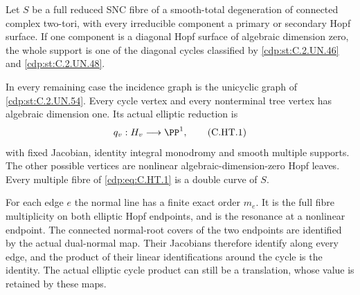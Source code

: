 \begin{proposition}\label{cdp:st:C.2.UN.58}

Let $S$ be a full reduced SNC fibre of a smooth-total degeneration
of connected complex two-tori, with every irreducible component a
primary or secondary Hopf surface. If one component is a diagonal
Hopf surface of algebraic dimension zero, the whole support is
one of the diagonal cycles classified by \ref{cdp:st:C.2.UN.46} and \ref{cdp:st:C.2.UN.48}.

In every remaining case the incidence graph is the unicyclic graph
of \ref{cdp:st:C.2.UN.54}. Every cycle vertex and every nonterminal tree vertex
has algebraic dimension one. Its actual elliptic reduction is
\[
                    q_v:H_v\longrightarrow\PP^1,        \tag{C.HT.1}\label{cdp:eq:C.HT.1}
\]
with fixed Jacobian, identity integral monodromy and smooth multiple
supports. The other possible vertices are nonlinear
algebraic-dimension-zero Hopf leaves. Every multiple fibre of
\eqref{cdp:eq:C.HT.1} is a double curve of $S$.

For each edge $e$ the normal line has a finite exact order $m_e$.
It is the full fibre multiplicity on both elliptic Hopf endpoints,
and is the resonance at a nonlinear endpoint. The connected
normal-root covers of the two endpoints are identified by the
actual dual-normal map. Their Jacobians therefore identify along
every edge, and the product of their linear identifications around
the cycle is the identity. The actual elliptic cycle product can
still be a translation, whose value is retained by these maps.


\end{proposition}
